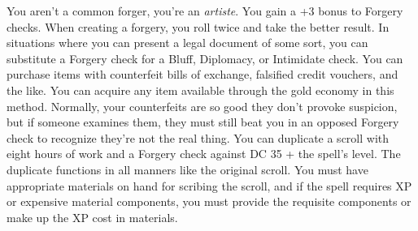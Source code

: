 {You aren't a common forger, you're an \textit{artiste}.}
{You gain a +3 bonus to Forgery checks.}
{When creating a forgery, you roll twice and take the better result.}
{In situations where you can present a legal document of some sort, you can substitute a Forgery check for a Bluff, Diplomacy, or Intimidate check.}
{You can purchase items with counterfeit bills of exchange, falsified credit vouchers, and the like. You can acquire any item available through the gold economy in this method. Normally, your counterfeits are so good they don't provoke suspicion, but if someone examines them, they must still beat you in an opposed Forgery check to recognize they're not the real thing.}
{You can duplicate a scroll with eight hours of work and a Forgery check against DC 35 + the spell's level. The duplicate functions in all manners like the original scroll. You must have appropriate materials on hand for scribing the scroll, and if the spell requires XP or expensive material components, you must provide the requisite components or make up the XP cost in materials.}